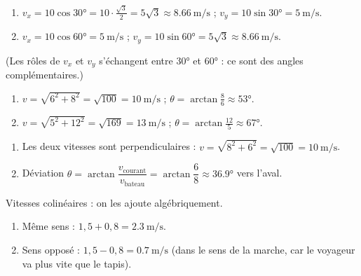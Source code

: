 \documentclass[11pt,a4paper]{article}
\begin{document}

\begin{corrige}
\begin{enumerate}[label=\alph*)]
  \item $v_x=10\cos\ang{30}=10\cdot\frac{\sqrt3}{2}=5\sqrt3\approx\qty{8,66}{\metre\per\second}$ ; $v_y=10\sin\ang{30}=\qty{5}{\metre\per\second}$.
  \item $v_x=10\cos\ang{60}=\qty{5}{\metre\per\second}$ ; $v_y=10\sin\ang{60}=5\sqrt3\approx\qty{8,66}{\metre\per\second}$.
\end{enumerate}
(Les rôles de $v_x$ et $v_y$ s'échangent entre \ang{30} et \ang{60} : ce sont des angles complémentaires.)
\end{corrige}

\begin{corrige}
\begin{enumerate}[label=\alph*)]
  \item $v=\sqrt{6^2+8^2}=\sqrt{100}=\qty{10}{\metre\per\second}$ ; $\theta=\arctan\frac{8}{6}\approx\ang{53}$.
  \item $v=\sqrt{5^2+12^2}=\sqrt{169}=\qty{13}{\metre\per\second}$ ; $\theta=\arctan\frac{12}{5}\approx\ang{67}$.
\end{enumerate}
\end{corrige}

\begin{corrige}
\begin{enumerate}[label=\alph*)]
  \item Les deux vitesses sont perpendiculaires : $v=\sqrt{8^2+6^2}=\sqrt{100}=\qty{10}{\metre\per\second}$.
  \item Déviation $\theta=\arctan\dfrac{v_{\text{courant}}}{v_{\text{bateau}}}=\arctan\dfrac{6}{8}\approx\ang{36,9}$ vers l'aval.
\end{enumerate}
\end{corrige}

\begin{corrige}
Vitesses colinéaires : on les ajoute algébriquement.
\begin{enumerate}[label=\alph*)]
  \item Même sens : $1{,}5+0{,}8=\qty{2,3}{\metre\per\second}$.
  \item Sens opposé : $1{,}5-0{,}8=\qty{0,7}{\metre\per\second}$ (dans le sens de la marche, car le voyageur va plus vite que le tapis).
\end{enumerate}
\end{corrige}
\end{document}
